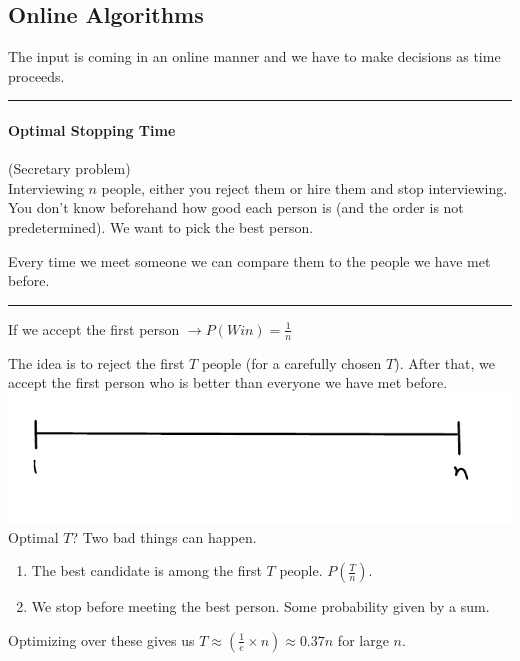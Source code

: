 \documentclass[12 pt]{article}
\begin{document}
          \subsection{Online Algorithms}
          The input is coming in an online manner and we have to make
          decisions as time proceeds.
          \\ \noindent \rule{\textwidth}{0.5pt}
          \paragraph{Optimal Stopping Time} (Secretary problem) \\
          Interviewing $n$ people, either you reject them or hire them and
          stop interviewing. You don't know beforehand how good each
          person is (and the order is not predetermined). We want to
          pick the best person.
          
          Every time we meet someone we can compare them to the people
          we have met before.
          \\ \noindent \rule{\textwidth}{0.5pt}
          If we accept the first person $\to P(Win)=\frac{1}{n}$

          The idea is to reject the first $T$ people (for a carefully
          chosen $T$). After that, we accept the first person who is
          better than everyone we have met before.
          \\ \includegraphics[width=.9\textwidth]{i162.pdf}
          \\ Optimal $T$? Two bad things can happen.
          \begin{enumerate}
          \item The best candidate is among the first $T$ people. $P
            \left(\frac{T}{n}\right)$.
          \item We stop before meeting the best person. Some
            probability given by a sum. 
          \end{enumerate}
          Optimizing over these gives us $T \approx
          \left(\frac{1}{e}\times n\right) \approx 0.37n$ for large $n$.
        
\end{document}
